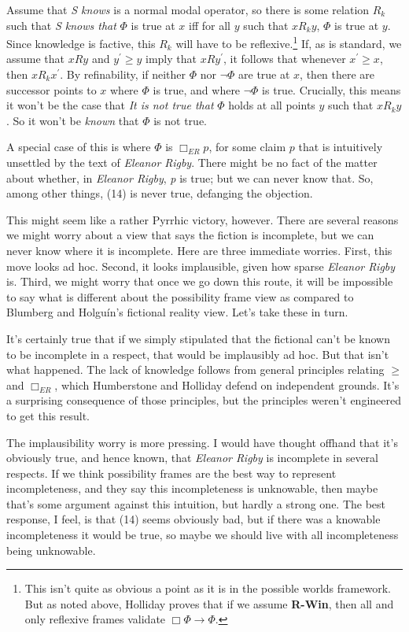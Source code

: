 \documentclass[
  11pt,
  letterpaper,
  DIV=11,
  numbers=noendperiod,
  twoside]{scrartcl}
\begin{document}
Assume that \emph{S knows} is a normal modal operator, so there is some
relation \(R_k\) such that \emph{S knows that} \(\Phi\) is true at \(x\)
iff for all \(y\) such that \(xR_ky\), \(\Phi\) is true at \(y\). Since
knowledge is factive, this \(R_k\) will have to be reflexive.\footnote{This
  isn't quite as obvious a point as it is in the possible worlds
  framework. But as noted above, Holliday proves that if we assume
  \textbf{R-Win}, then all and only reflexive frames validate
  \(\Box \Phi \rightarrow \Phi\).} If, as is standard, we assume that
\(xRy\) and \(y^\prime \geqslant y\) imply that \(xRy^\prime\), it
follows that whenever \(x^\prime \geqslant x\), then \(xR_kx^\prime\).
By refinability, if neither \(\Phi\) nor \(\neg \Phi\) are true at
\(x\), then there are successor points to \(x\) where \(\Phi\) is true,
and where \(\neg \Phi\) is true. Crucially, this means it won't be the
case that \emph{It is not true that} \(\Phi\) holds at all points \(y\)
such that \(xR_ky\). So it won't be \emph{known} that \(\Phi\) is not
true.

A special case of this is where \(\Phi\) is \(\Box_{ER}p\), for some
claim \(p\) that is intuitively unsettled by the text of \emph{Eleanor
Rigby}. There might be no fact of the matter about whether, in
\emph{Eleanor Rigby}, \emph{p} is true; but we can never know that. So,
among other things, (14) is never true, defanging the objection.

This might seem like a rather Pyrrhic victory, however. There are
several reasons we might worry about a view that says the fiction is
incomplete, but we can never know where it is incomplete. Here are three
immediate worries. First, this move looks ad hoc. Second, it looks
implausible, given how sparse \emph{Eleanor Rigby} is. Third, we might
worry that once we go down this route, it will be impossible to say what
is different about the possibility frame view as compared to Blumberg
and Holguín's fictional reality view. Let's take these in turn.

It's certainly true that if we simply stipulated that the fictional
can't be known to be incomplete in a respect, that would be implausibly
ad hoc. But that isn't what happened. The lack of knowledge follows from
general principles relating \(\geqslant\) and \(\Box_{ER}\), which
Humberstone and Holliday defend on independent grounds. It's a
surprising consequence of those principles, but the principles weren't
engineered to get this result.

The implausibility worry is more pressing. I would have thought offhand
that it's obviously true, and hence known, that \emph{Eleanor Rigby} is
incomplete in several respects. If we think possibility frames are the
best way to represent incompleteness, and they say this incompleteness
is unknowable, then maybe that's some argument against this intuition,
but hardly a strong one. The best response, I feel, is that (14) seems
obviously bad, but if there was a knowable incompleteness it would be
true, so maybe we should live with all incompleteness being unknowable.
\end{document}
